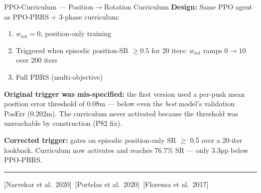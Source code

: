 \documentclass[aspectratio=169,xcolor=dvipsnames,t]{beamer}
\newcommand{\litfooter}[1]{%
  \vspace{2pt}%
  \hrule%
  \vspace{2pt}%
  {\tiny\color{LightDarkGrey} #1}%
}
\begin{document}
\begin{frame}[t]{PPO-Curriculum — Position$\to$Rotation Curriculum }
  \textbf{Design:} Same PPO agent as PPO-PBRS + 3-phase curriculum:
  \begin{enumerate}
    \item $w_{\text{rot}}=0$, position-only training
    \item Triggered when episodic position-SR $\ge 0.5$ for 20 iters: $w_{\text{rot}}$ ramps $0\to10$ over 200 iters
    \item Full PBRS (multi-objective)
  \end{enumerate}

  \vspace{2pt}
  \textbf{\textcolor{hlred}{Original trigger was mis-specified:}} the first version used a per-push mean position error threshold of 0.08m — below even the \emph{best} model's validation PosErr (0.202m). The curriculum never activated because the threshold was unreachable by construction (P82 fix).

  \vspace{2pt}
  \textbf{Corrected trigger:} gates on episodic position-only SR $\ge$ 0.5 over a 20-iter lookback. Curriculum now activates and reaches \textcolor{hlgreen}{76.7\% SR} — only 3.3pp below PPO-PBRS.

  \vfill\litfooter{[Narvekar et al.\ 2020]~[Portelas et al.\ 2020]~[Florensa et al.\ 2017]}
\end{frame}

\end{document}
